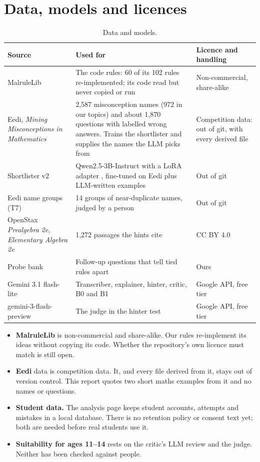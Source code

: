 \documentclass[11pt,a4paper]{article}
\begin{document}
\section{Data, models and licences}\label{app:data}
\begin{table}[H]
\centering\small
\begin{tabularx}{\linewidth}{@{}P{3.6cm}YP{3.7cm}@{}}
\toprule
Source & Used for & Licence and handling \\
\midrule
MalruleLib \cite{malrulelib} & The code rules: 60 of its 102 rules re-implemented; its code read but never copied or run & Non-commercial, share-alike \\
Eedi, \emph{Mining Misconceptions in Mathematics} \cite{eedi} & 2,587 misconception names (972 in our topics) and about 1,870 questions with labelled wrong answers. Trains the shortlister and supplies the names the LLM picks from & Competition data: out of git, with every derived file \\
Shortlister v2 & Qwen2.5-3B-Instruct \cite{qwen25} with a LoRA adapter \cite{lora}, fine-tuned on Eedi plus LLM-written examples & Out of git \\
Eedi name groups (T7) & 14 groups of near-duplicate names, judged by a person & Out of git \\
OpenStax \emph{Prealgebra 2e}, \emph{Elementary Algebra 2e} \cite{openstax-pre,openstax-alg} & 1,272 passages the hints cite & CC BY 4.0 \\
Probe bank & Follow-up questions that tell tied rules apart & Ours \\
Gemini 3.1 flash-lite & Transcriber, explainer, hinter, critic, B0 and B1 & Google API, free tier \\
gemini-3-flash-preview & The judge in the hinter test & Google API, free tier \\
\bottomrule
\end{tabularx}
\caption{Data and models.}
\end{table}
\begin{itemize}
  \item \textbf{MalruleLib} is non-commercial and share-alike. Our rules re-implement its ideas without copying its code. Whether the repository's own licence must match is still open.
  \item \textbf{Eedi} data is competition data. It, and every file derived from it, stays out of version control. This report quotes two short maths examples from it and no names or questions.
  \item \textbf{Student data.} The analysis page keeps student accounts, attempts and mistakes in a local database. There is no retention policy or consent text yet; both are needed before real students use it.
  \item \textbf{Suitability for ages 11--14} rests on the critic's LLM review and the judge. Neither has been checked against people.
\end{itemize}
\end{document}
